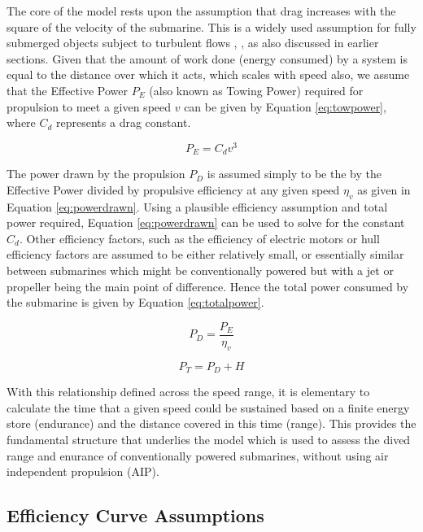 \documentclass{article}\usepackage[]{graphicx}\usepackage[]{color}
\begin{document}
The core of the model rests upon the assumption that drag increases with the square of the velocity of the submarine.  This is a widely used assumption for fully submerged objects subject to turbulent flows \parencite[5]{wislicenus1973}, \parencite{davies2017}, as also discussed in earlier sections. Given that the amount of work done (energy consumed) by a system is equal to the distance over which it acts, which scales with speed also, we assume that the Effective Power $P_E$ (also known as Towing Power) required for propulsion to meet a given speed $v$ can be given by Equation \ref{eq:towpower}, where $C_d$ represents a drag constant.

\begin{equation}
\label{eq:towpower}
P_E = C_dv^3
\end{equation}

The power drawn by the propulsion $P_D$ is assumed simply to be the by the Effective Power divided by propulsive efficiency at any given speed $\eta_v$ as given in Equation \ref{eq:powerdrawn}.  Using a plausible efficiency assumption and total power required, Equation \ref{eq:powerdrawn} can be used to solve for the constant $C_d$.  Other efficiency factors, such as the efficiency of electric motors or hull efficiency factors are assumed to be either relatively small, or essentially similar between submarines which might be conventionally powered but with a jet or propeller being the main point of difference.  Hence the total power consumed by the submarine is given by Equation \ref{eq:totalpower}.

\begin{equation}
\label{eq:powerdrawn}
P_D = \frac{P_E}{\eta_v}
\end{equation}

\begin{equation}
\label{eq:totalpower}
P_T = P_D + H
\end{equation}

With this relationship defined across the speed range, it is elementary to calculate the time that a given speed could be sustained based on a finite energy store (endurance) and the distance covered in this time (range).  This provides the fundamental structure that underlies the model which is used to assess the dived range and enurance of conventionally powered submarines, without using air independent propulsion (AIP).

\subsection{Efficiency Curve Assumptions}
\end{document}
